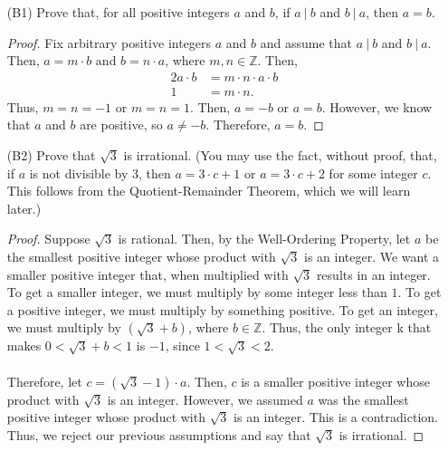 \documentclass{article}
\begin{document}
\begin{itemize}
	\item [(B1)] Prove that, for all positive integers $a$ and $b$, if $a \ |\ b$ and $b \ |\ a$, then $a = b$.
            \begin{proof}
                Fix arbitrary positive integers $a$ and $b$ and assume that $a \ |\ b$ and $b \ |\ a$. Then, $a = m \cdot b$ and $b = n \cdot a$, where $m, n \in \mathbb{Z}$. Then, 
                \begin{alignat*}{2}
                    a\cdot b &= m\cdot n\cdot a\cdot b \\
                    1 &= m\cdot n.
                \end{alignat*}
                Thus, $m = n = -1$ or $m = n = 1$. Then, $a = \minus b$ or $a = b$. However, we know that $a$ and $b$ are positive, so $a \ne \minus b$. Therefore, $a = b$.
            \end{proof}

	\item [(B2)] Prove that $\sqrt{3}$ is irrational.  (You may use the fact, without proof, that, if $a$ is not divisible by $3$, then $a = 3 \cdot c + 1$ or $a = 3 \cdot c + 2$ for some integer $c$.  This follows from the Quotient-Remainder Theorem, which we will learn later.)
            \begin{proof}
                Suppose $\sqrt{3}$ is rational. Then, by the Well-Ordering Property, let $a$ be the smallest positive integer whose product with $\sqrt{3}$ is an integer. We want a smaller positive integer that, when multiplied with $\sqrt{3}$ results in an integer. To get a smaller integer, we must multiply by some integer less than $1$. To get a positive integer, we must multiply by something positive. To get an integer, we must multiply by $(\sqrt{3} + b)$, where $b\in \mathbb{Z}$. Thus, the only integer k that makes $0 < \sqrt{3} + b < 1$ is $\minus 1$, since $1 < \sqrt{3} < 2$.\\\\
                Therefore, let $c = (\sqrt{3} - 1)\cdot a$. Then, $c$ is a smaller positive integer whose product with $\sqrt{3}$ is an integer. However, we assumed $a$ was the smallest positive integer whose product with $\sqrt{3}$ is an integer. This is a contradiction. Thus, we reject our previous assumptions and say that $\sqrt{3}$ is irrational. 
            \end{proof}

        
\end{itemize}
\end{document}

